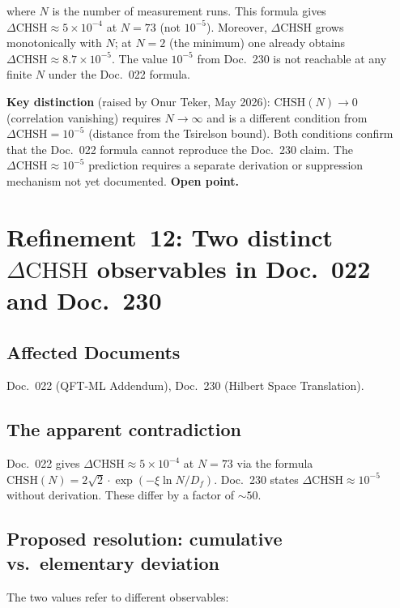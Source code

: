 where $N$ is the number of measurement runs. This formula gives
$\Delta\text{CHSH} \approx 5\times10^{-4}$ at $N=73$ (not $10^{-5}$).
Moreover, $\Delta\text{CHSH}$ grows monotonically with $N$; at $N=2$
(the minimum) one already obtains $\Delta\text{CHSH} \approx 8.7\times10^{-5}$.
The value $10^{-5}$ from Doc.~230 is not reachable at any finite $N$
under the Doc.~022 formula.

\textbf{Key distinction} (raised by Onur Teker, May 2026):
$\text{CHSH}(N)\to 0$ (correlation vanishing) requires $N\to\infty$
and is a different condition from $\Delta\text{CHSH}=10^{-5}$
(distance from the Tsirelson bound). Both conditions confirm that
the Doc.~022 formula cannot reproduce the Doc.~230 claim.
The $\Delta\text{CHSH}\approx 10^{-5}$ prediction requires a separate
derivation or suppression mechanism not yet documented. \textbf{Open point.}


\section{\texorpdfstring{Refinement~12: Two distinct $\Delta\text{CHSH}$ observables in Doc.~022 and Doc.~230}{Refinement 12: Two distinct CHSH observables}}

\subsection*{Affected Documents}

Doc.~022 (QFT-ML Addendum), Doc.~230 (Hilbert Space Translation).

\subsection*{The apparent contradiction}

Doc.~022 gives $\Delta\text{CHSH} \approx 5\times10^{-4}$ at $N=73$
via the formula $\text{CHSH}(N) = 2\sqrt{2}\cdot\exp(-\xi\ln N/D_f)$.
Doc.~230 states $\Delta\text{CHSH} \approx 10^{-5}$ without derivation.
These differ by a factor of $\sim50$.

\subsection*{Proposed resolution: cumulative vs.\ elementary deviation}

The two values refer to different observables:

